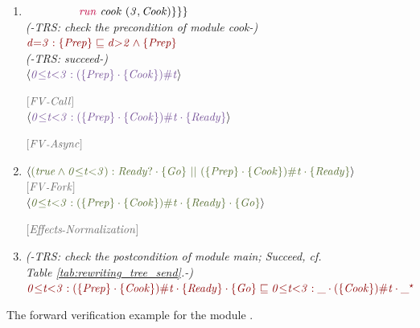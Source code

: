 \documentclass[acmsmall,10pt,review]{acmart}
\newcommand{\key}[1]{\textcolor{purple}{\code{#1}}}
\newcommand{\siderule}[1]{
\code{\footnotesize{\textcolor{mGray}{#1}}}}
\newcommand{\code}[1]{{\tt{\ensuremath{\m{#1}}}}}
\newcommand{\CONTAIN}{\sqsubseteq}
\newcommand{\m}{\mathit}
\newcommand\tabref[1]{Table \textcolor{black}{\ref{#1}}.}
\begin{document}
{\begin{figure}[ht]
\begin{minipage}[c]{\columnwidth}
{\begin{enumerate}
  \item      \code{~\qquad \ \qquad \key{run}\ cook\ (3, Cook) 
     \}\}\}}
      \\
                     \textcolor{mGray}{\emph{(-TRS: check the  precondition of module cook-) }} \\
              \code{  \textcolor{darkred}{d{=}3 : \{Prep\}  \CONTAIN  d{>}2 \wedge \{Prep\}} }   \\
             
               \textcolor{mGray}{\emph{(-TRS: succeed-) }}
      \\
     \code{\langle  \textcolor{darklavender}{ 0{\leq}t {<}3 : (\{Prep\}\cdot \{Cook\})\# t}  \rangle } 
     \siderule{ [FV\text{-}Call]}
      \\
     \code{\langle  \textcolor{darklavender}{ 0{\leq}t {<}3 : (\{Prep\}\cdot \{Cook\})\# t \cdot \{ Ready\}}  \rangle } 
     \siderule{ [FV\text{-}Async]}
     \\ \item
                   \code{\langle \textcolor{huntergreen}{(true \wedge 0{\leq}t {<}3) :  Ready? \cdot\{Go\}  \ || \  (\{Prep\}\cdot \{Cook\})\# t \cdot \{ Ready\}} \rangle }   \siderule{ [FV\text{-}Fork]} 
        \\ 
         \code{\langle \textcolor{huntergreen}{0{\leq}t {<}3 : (\{Prep\}\cdot \{Cook\})\# t \cdot \{ Ready\} \cdot \{Go\}} \rangle }
         \siderule{ [Effects\text{-}Normalization]} 
         \\
              \item 
               \textcolor{mGray}{  \emph{(-TRS: check the  postcondition of module main; Succeed, cf. \tabref{tab:rewriting_tree_send}-) }}\\
                  \code{  \textcolor{darkred}{
{0 {\leq} t {<}3} : (\{Prep\}\cdot \{Cook\})\# t \cdot \{ Ready\} \cdot \{Go\}
 \CONTAIN {0 {\leq} t  {<}3} : \_\cdot (\{Cook\})\# t \cdot\_^\star} 
                  }    \\
     
\end{enumerate}}

     \end{minipage}
      \vspace{0mm}
      \caption{The forward verification example for the module {}. }\label{fig:forward_example}
      \vspace{-1mm}
\end{figure}
}
\end{document}
